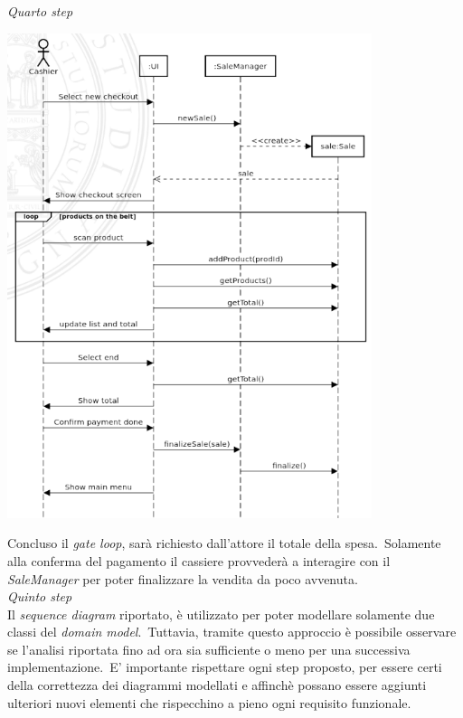 \documentclass{article}
\begin{document}
\pagebreak
\textit{Quarto step}
\begin{center}
    \includegraphics[width=0.8\textwidth]{foto 4.png}
\end{center}\vspace*{14pt}
Concluso il \textit{gate loop}, sarà richiesto dall'attore il totale della spesa.\ Solamente alla conferma del pagamento il cassiere provvederà a interagire con il \textit{SaleManager} per poter finalizzare la vendita da poco avvenuta.\vspace*{14pt}\\
\textit{Quinto step}\\
Il \textit{sequence diagram} riportato, è utilizzato per poter modellare solamente due classi del \textit{domain model}.\ Tuttavia, tramite questo approccio è possibile osservare se l'analisi riportata fino ad ora sia sufficiente o meno per una successiva implementazione.\ E' importante rispettare ogni step proposto, per essere certi della correttezza dei diagrammi modellati e affinchè possano essere aggiunti ulteriori nuovi elementi che rispecchino a pieno ogni requisito funzionale.\vspace*{7pt}
\end{document}
